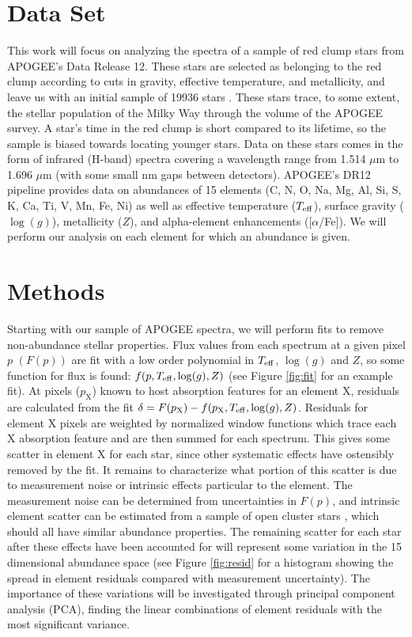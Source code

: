 \documentclass[preprint]{aastex}
\begin{document}
\section{Data Set}
\label{sec:data}
This work will focus on analyzing the spectra of a sample of red clump stars from APOGEE's Data Release 12. These stars are selected as belonging to the red clump according to cuts in gravity, effective temperature, and metallicity, and leave us with an initial sample of 19936 stars \citep{bovy2015}. These stars trace, to some extent, the stellar population of the Milky Way through the volume of the APOGEE survey. A star's time in the red clump is short compared to its lifetime, so the sample is biased towards locating younger stars. Data on these stars comes in the form of infrared (H-band) spectra covering a wavelength range from 1.514 $\mu$m to 1.696 $\mu$m (with some small nm gaps between detectors)\citep{APOGEE}. APOGEE's DR12 pipeline provides data on abundances of 15 elements (C, N, O, Na, Mg, Al, Si, S, K, Ca, Ti, V, Mn, Fe, Ni) as well as effective temperature ($T_{\rm eff}$), surface gravity ($\log(g)$), metallicity ($Z$), and alpha-element enhancements ([$\alpha$/Fe])\citep{holtzman2015}. We will perform our analysis on each element for which an abundance is given.

\section{Methods}
\label{sec:methods}
Starting with our sample of APOGEE spectra, we will perform fits to remove non-abundance stellar properties. Flux values from each spectrum at a given pixel $p$ $(F(p))$ are fit with a low order polynomial in $T_{\rm eff}$, $\log(g)$ and $Z$, so some function for flux is found: $f(p,T_{\rm eff},\log(g),Z)$ (see Figure \ref{fig:fit} for an example fit). At pixels ($p_\mathrm{X}$) known to host absorption features for an element X, residuals are calculated from the fit $\delta = F(p_\mathrm{X}) - f(p_\mathrm{X},T_{\rm eff},\log(g),Z)$. Residuals for element X pixels are weighted by normalized window functions which trace each X absorption feature and are then summed for each spectrum. This gives some scatter in element X for each star, since other systematic effects have ostensibly removed by the fit. It remains to characterize what portion of this scatter is due to measurement noise or intrinsic effects particular to the element. The measurement noise can be determined from uncertainties in $F(p)$, and intrinsic element scatter can be estimated from a sample of open cluster stars \citep{meszaros2015}, which should all have similar abundance properties. The remaining scatter for each star after these effects have been accounted for will represent some variation in the 15 dimensional abundance space (see Figure \ref{fig:resid} for a histogram showing the spread in element residuals compared with measurement uncertainty). The importance of these variations will be investigated through principal component analysis (PCA), finding the linear combinations of element residuals with the most significant variance.
\end{document}
